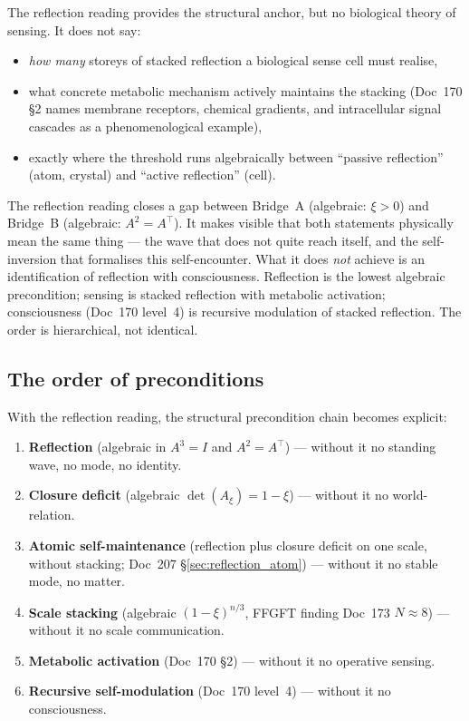 The reflection reading provides the structural anchor, but no biological theory of sensing. It does not say:

\begin{itemize}
\item \emph{how many} storeys of stacked reflection a biological sense cell must realise,
\item what concrete metabolic mechanism actively maintains the stacking (Doc~170 \S2 names membrane receptors, chemical gradients, and intracellular signal cascades as a phenomenological example),
\item exactly where the threshold runs algebraically between ``passive reflection'' (atom, crystal) and ``active reflection'' (cell).
\end{itemize}

\begin{interpretation}
The reflection reading closes a gap between Bridge~A (algebraic: $\xi > 0$) and Bridge~B (algebraic: $A^2 = A^\top$). It makes visible that both statements physically mean the same thing --- the wave that does not quite reach itself, and the self-inversion that formalises this self-encounter. What it does \emph{not} achieve is an identification of reflection with consciousness. Reflection is the lowest algebraic precondition; sensing is stacked reflection with metabolic activation; consciousness (Doc~170 level~4) is recursive modulation of stacked reflection. The order is hierarchical, not identical.
\end{interpretation}

\subsection{The order of preconditions}\label{sec:reflection_order}

With the reflection reading, the structural precondition chain becomes explicit:

\begin{enumerate}
\item \textbf{Reflection} (algebraic in $A^3 = I$ and $A^2 = A^\top$) --- without it no standing wave, no mode, no identity.
\item \textbf{Closure deficit} (algebraic $\det(A_\xi) = 1-\xi$) --- without it no world-relation.
\item \textbf{Atomic self-maintenance} (reflection plus closure deficit on one scale, without stacking; Doc~207 \S\ref{sec:reflection_atom}) --- without it no stable mode, no matter.
\item \textbf{Scale stacking} (algebraic $(1-\xi)^{n/3}$, FFGFT finding Doc~173 $N \approx 8$) --- without it no scale communication.
\item \textbf{Metabolic activation} (Doc~170 \S2) --- without it no operative sensing.
\item \textbf{Recursive self-modulation} (Doc~170 level~4) --- without it no consciousness.
\end{enumerate}

